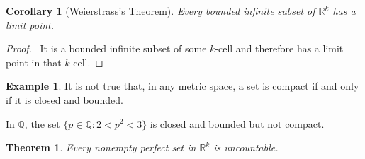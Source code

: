 \documentclass{book}
\let\qed\relax
\newtheorem{cor}{Corollary}[prop]
\newtheorem{thm}[prop]{Theorem}
\theoremstyle{definition}
\newtheorem{ex}[prop]{Example}
\begin{document}
\begin{cor}[Weierstrass's Theorem]
Every bounded infinite subset of $\mathbb{R}^k$ has a limit point.
\end{cor}

\begin{proof}
\pf\ It is a bounded infinite subset of some $k$-cell and therefore has a limit point in that $k$-cell. \qed
\end{proof}

\begin{ex}
It is not true that, in any metric space, a set is compact if and only if it is closed and bounded.

In $\mathbb{Q}$, the set $\{ p \in \mathbb{Q} : 2 < p^2 < 3 \}$ is closed and bounded but not compact.
\end{ex}

\begin{thm}
Every nonempty perfect set in $\mathbb{R}^k$ is uncountable.
\end{thm}
\end{document}
